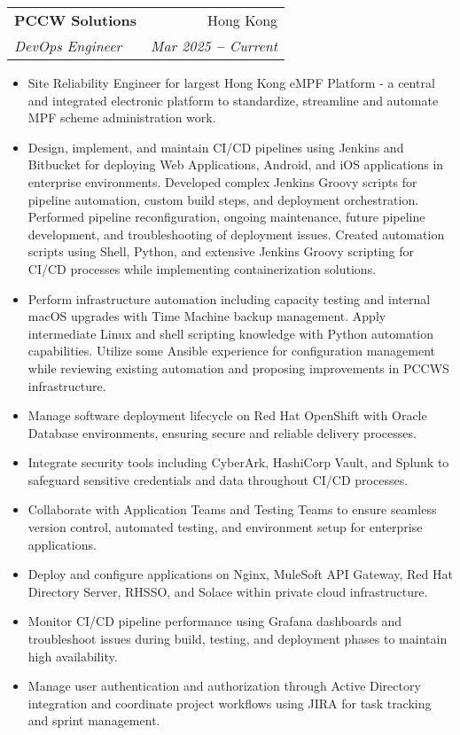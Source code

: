 \documentclass[letterpaper,11pt]{article}
\makeatletter
\newcommand{\resumeItem}[1]{
  \item\small{
    {#1 \vspace{-2pt}}
  }
}
\newcommand{\resumeSubheading}[4]{
  \vspace{-2pt}\item
    \begin{tabular*}{0.97\textwidth}[t]{l@{\extracolsep{\fill}}r}
      \textbf{#1} & #2 \\
      \textit{\small#3} & \textit{\small #4} \\
    \end{tabular*}\vspace{-7pt}
}
\newcommand{\resumeItemListStart}{\begin{itemize}}
\newcommand{\resumeItemListEnd}{\end{itemize}\vspace{-5pt}}
\makeatother
\begin{document}
    \resumeSubheading
      {PCCW Solutions}{Hong Kong}
      {DevOps Engineer}{Mar 2025 \textbf{--} Current}
        \resumeItemListStart
            \resumeItem{Site Reliability Engineer for largest Hong Kong eMPF Platform - a central and integrated electronic platform to standardize, streamline and automate MPF scheme administration work.}
            \resumeItem{Design, implement, and maintain CI/CD pipelines using Jenkins and Bitbucket for deploying Web Applications, Android, and iOS applications in enterprise environments. Developed complex Jenkins Groovy scripts for pipeline automation, custom build steps, and deployment orchestration. Performed pipeline reconfiguration, ongoing maintenance, future pipeline development, and troubleshooting of deployment issues. Created automation scripts using Shell, Python, and extensive Jenkins Groovy scripting for CI/CD processes while implementing containerization solutions.}
            \resumeItem{Perform infrastructure automation including capacity testing and internal macOS upgrades with Time Machine backup management. Apply intermediate Linux and shell scripting knowledge with Python automation capabilities. Utilize some Ansible experience for configuration management while reviewing existing automation and proposing improvements in PCCWS infrastructure.}
            \resumeItem{Manage software deployment lifecycle on Red Hat OpenShift with Oracle Database environments, ensuring secure and reliable delivery processes.}
            \resumeItem{Integrate security tools including CyberArk, HashiCorp Vault, and Splunk to safeguard sensitive credentials and data throughout CI/CD processes.}
            \resumeItem{Collaborate with Application Teams and Testing Teams to ensure seamless version control, automated testing, and environment setup for enterprise applications.}
            \resumeItem{Deploy and configure applications on Nginx, MuleSoft API Gateway, Red Hat Directory Server, RHSSO, and Solace within private cloud infrastructure.}
            \resumeItem{Monitor CI/CD pipeline performance using Grafana dashboards and troubleshoot issues during build, testing, and deployment phases to maintain high availability.}
            \resumeItem{Manage user authentication and authorization through Active Directory integration and coordinate project workflows using JIRA for task tracking and sprint management.}
        \resumeItemListEnd
\end{document}
